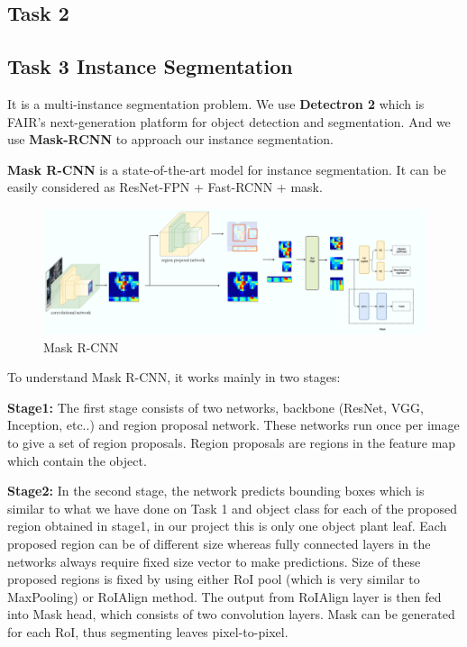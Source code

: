 \documentclass[conference]{IEEEtran}
\begin{document}
\subsection{Task 2}

\subsection{Task 3 Instance Segmentation}

It is a multi-instance segmentation problem. We use \textbf{Detectron 2}\cite{wu2019detectron2} which is FAIR's next-generation platform for object detection and segmentation. And we use \textbf{Mask-RCNN}\cite{He_2017} to approach our instance segmentation.

\textbf{Mask R-CNN} is a state-of-the-art model for instance segmentation. It can be easily considered as ResNet-FPN + Fast-RCNN + mask.

\begin{figure}[h!]
\centering
\includegraphics[width=\linewidth]{img/maskrcnn.png}
\caption{Mask R-CNN}
\label{fig_mask-rcnn}
\end{figure}

To understand Mask R-CNN, it works mainly in two stages:

\textbf{Stage1:} The first stage consists of two networks, backbone (ResNet, VGG, Inception, etc..) and region proposal network. These networks run once per image to give a set of region proposals. Region proposals are regions in the feature map which contain the object.

\textbf{Stage2:} In the second stage, the network predicts bounding boxes which is similar to what we have done on Task 1 and object class for each of the proposed region obtained in stage1, in our project this is only one object plant leaf. 
Each proposed region can be of different size whereas fully connected layers in the networks always require fixed size vector to make predictions. Size of these proposed regions is fixed by using either RoI pool (which is very similar to MaxPooling) or RoIAlign method.
The output from RoIAlign layer is then fed into Mask head, which consists of two convolution layers. Mask can be generated for each RoI, thus segmenting leaves pixel-to-pixel.
\end{document}
